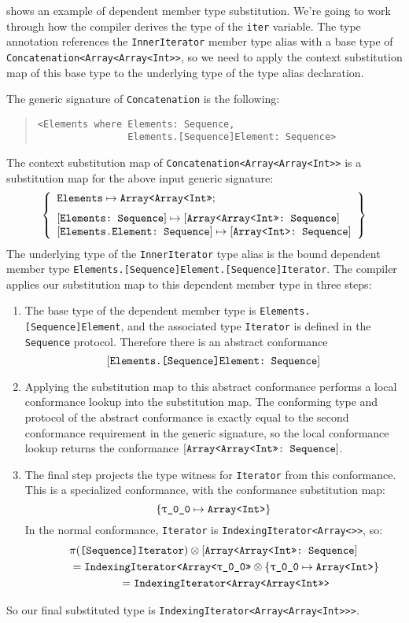 \documentclass[../generics]{subfiles}
\begin{document}
\begin{example}
 shows an example of dependent member type substitution. We're going to work through how the compiler derives the type of the \texttt{iter} variable.
The type annotation references the \texttt{InnerIterator} member type alias with a base type of \texttt{Concatenation<Array<Array<Int>>}, so we need to apply the context substitution map of this base type to the underlying type of the type alias declaration.

The generic signature of \texttt{Concatenation} is the following:
\begin{quote}
\begin{verbatim}
<Elements where Elements: Sequence,
                Elements.[Sequence]Element: Sequence>
\end{verbatim}
\end{quote}
The context substitution map of \texttt{Concatenation<Array<Array<Int>>} is a substitution map for the above input generic signature:
\[
\SubstMapLongC{
\SubstType{Elements}{Array<Array<Int>>}
}{
\SubstConf{Elements}{Array<Array<Int>>}{Sequence}\\
\SubstConf{Elements.Element}{Array<Int>}{Sequence}
}
\]
The underlying type of the \texttt{InnerIterator} type alias is the bound dependent member type \verb|Elements.[Sequence]Element.[Sequence]Iterator|. The compiler applies our substitution map to this dependent member type in three steps:
\begin{enumerate}
\item The base type of the dependent member type is \verb|Elements.[Sequence]Element|, and the associated type \texttt{Iterator} is defined in the \texttt{Sequence} protocol. Therefore there is an abstract conformance
\[[\texttt{Elements.[Sequence]Element:~Sequence}]\]
\item Applying the substitution map to this abstract conformance performs a local conformance lookup into the substitution map. The conforming type and protocol of the abstract conformance is exactly equal to the second conformance requirement in the generic signature, so the local conformance lookup returns the conformance $[\texttt{Array<Array<Int>>:~Sequence}]$.
\item The final step projects the type witness for \texttt{Iterator} from this conformance. This is a specialized conformance, with the conformance substitution map:
\[\SubstMap{\SubstType{\ttgp{0}{0}}{Array<Int>}}\]
In the normal conformance, \texttt{Iterator} is \texttt{IndexingIterator<Array<>>}, so:
\begin{gather*}
\AssocType{[Sequence]Iterator}\otimes \ConfReq{Array<Array<Int>>}{Sequence}\\
\qquad {} = \texttt{IndexingIterator<Array<\ttgp{0}{0}>>}\otimes \SubstMap{\SubstType{\ttgp{0}{0}}{Array<Int>}}\\
\qquad {} = \texttt{IndexingIterator<Array<Array<Int>>>}
\end{gather*}
\end{enumerate}
So our final substituted type is \verb|IndexingIterator<Array<Array<Int>>>|.
\end{example}
\end{document}
